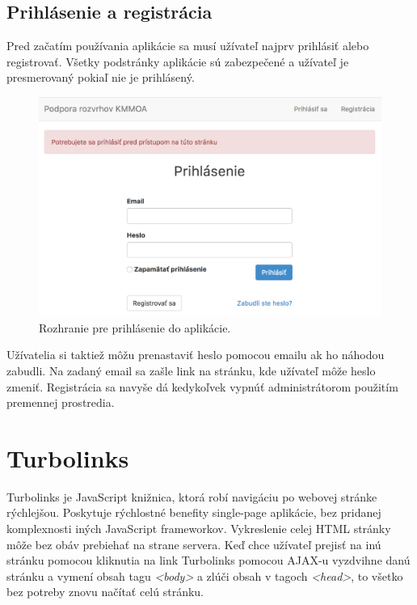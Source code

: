\subsection{Prihlásenie a registrácia}

Pred začatím používania aplikácie sa musí užívateľ najprv prihlásiť alebo registrovať. Všetky podstránky aplikácie sú zabezpečené a užívateľ je presmerovaný pokiaľ nie je prihlásený.

\begin{figure}[!htb]
  \centering
  \includegraphics[width=1\textwidth]{content/images/login}
  \caption{Rozhranie pre prihlásenie do aplikácie.}
\end{figure}

Užívatelia si taktiež môžu prenastaviť heslo pomocou emailu ak ho náhodou zabudli. Na zadaný email sa zašle link na stránku, kde užívateľ môže heslo zmeniť. Registrácia sa navyše dá kedykoľvek vypnúť administrátorom použitím premennej prostredia.

\clearpage
\section{Turbolinks}

Turbolinks je JavaScript knižnica, ktorá robí navigáciu po webovej stránke rýchlejšou. Poskytuje rýchlostné benefity single-page aplikácie, bez pridanej komplexnosti iných JavaScript frameworkov. Vykreslenie celej HTML stránky môže bez obáv prebiehať na strane servera. Keď chce užívateľ prejisť na inú stránku pomocou kliknutia na link Turbolinks pomocou AJAX-u vyzdvihne danú stránku a vymení obsah tagu \emph{<body>} a zlúči obsah v tagoch \emph{<head>}, to všetko bez potreby znovu načítať celú stránku. \citep{web:turbolinks}


